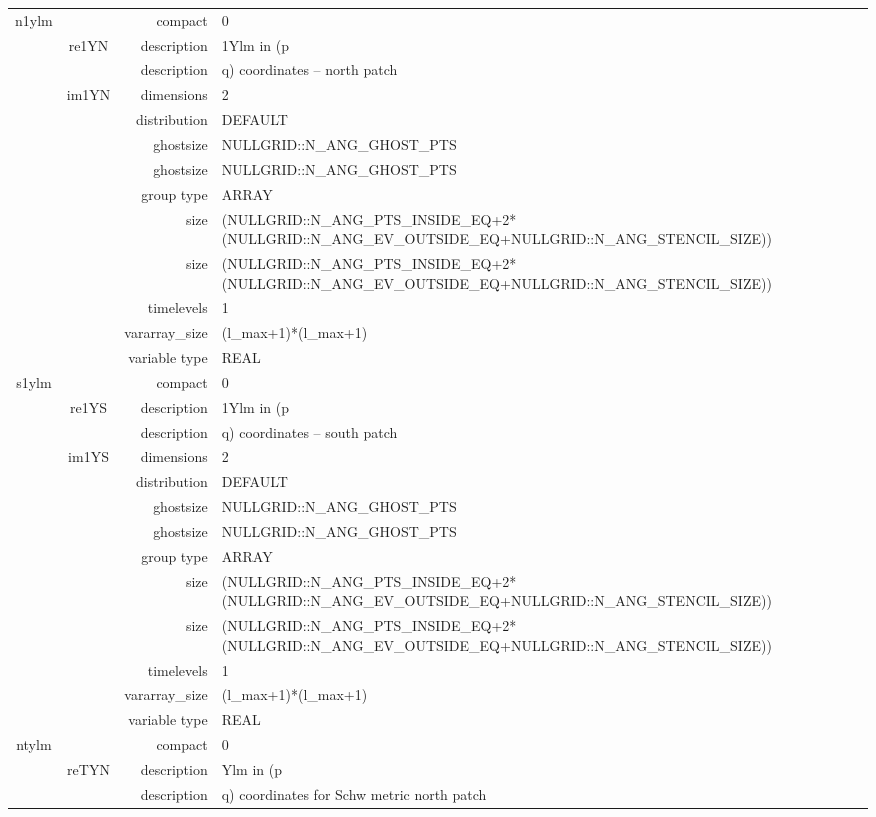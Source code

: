 \begin{tabular*}{150mm}{|c|c@{\extracolsep{\fill}}|rl|}
n1ylm &  & compact & 0 \\ 
 & re1YN & description & 1Ylm in (p \\ 
& ~ & description & q) coordinates -- north patch \\ 
 & im1YN & dimensions & 2 \\ 
 &  & distribution & DEFAULT \\ 
 &  & ghostsize & NULLGRID::N\_ANG\_GHOST\_PTS \\ 
& ~ & ghostsize & NULLGRID::N\_ANG\_GHOST\_PTS \\ 
 &  & group type & ARRAY \\ 
 &  & size & (NULLGRID::N\_ANG\_PTS\_INSIDE\_EQ+2*(NULLGRID::N\_ANG\_EV\_OUTSIDE\_EQ+NULLGRID::N\_ANG\_STENCIL\_SIZE)) \\ 
& ~ & size & (NULLGRID::N\_ANG\_PTS\_INSIDE\_EQ+2*(NULLGRID::N\_ANG\_EV\_OUTSIDE\_EQ+NULLGRID::N\_ANG\_STENCIL\_SIZE)) \\ 
 &  & timelevels & 1 \\ 
 &  & vararray\_size & (l\_max+1)*(l\_max+1) \\ 
 &  & variable type & REAL \\ 
\hline 
s1ylm &  & compact & 0 \\ 
 & re1YS & description & 1Ylm in (p \\ 
& ~ & description & q) coordinates -- south patch \\ 
 & im1YS & dimensions & 2 \\ 
 &  & distribution & DEFAULT \\ 
 &  & ghostsize & NULLGRID::N\_ANG\_GHOST\_PTS \\ 
& ~ & ghostsize & NULLGRID::N\_ANG\_GHOST\_PTS \\ 
 &  & group type & ARRAY \\ 
 &  & size & (NULLGRID::N\_ANG\_PTS\_INSIDE\_EQ+2*(NULLGRID::N\_ANG\_EV\_OUTSIDE\_EQ+NULLGRID::N\_ANG\_STENCIL\_SIZE)) \\ 
& ~ & size & (NULLGRID::N\_ANG\_PTS\_INSIDE\_EQ+2*(NULLGRID::N\_ANG\_EV\_OUTSIDE\_EQ+NULLGRID::N\_ANG\_STENCIL\_SIZE)) \\ 
 &  & timelevels & 1 \\ 
 &  & vararray\_size & (l\_max+1)*(l\_max+1) \\ 
 &  & variable type & REAL \\ 
\hline 
ntylm &  & compact & 0 \\ 
 & reTYN & description & Ylm in (p \\ 
& ~ & description & q) coordinates for Schw metric north patch \\ 

\end{tabular*}
